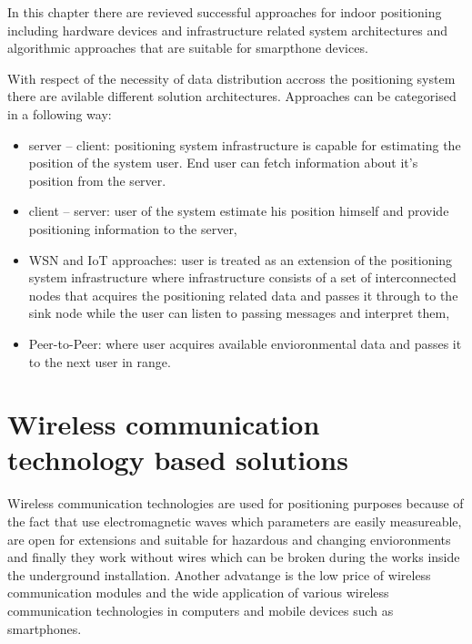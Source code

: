 \documentclass[../main.tex]{subfiles}
\begin{document}
In this chapter there are revieved successful approaches for indoor positioning including hardware devices and infrastructure related system architectures and algorithmic approaches that are suitable for smarpthone devices.


With respect of the necessity of data distribution accross the positioning system there are avilable different solution architectures. Approaches can be categorised in a following way:
\begin{itemize}
	\item server -- client: positioning system infrastructure is capable for estimating the position of the system user. End user can fetch information about it's position from the server.
	\item client -- server: user of the system estimate his position himself and provide positioning information to the server,
	\item WSN and IoT approaches: user is treated as an extension of the positioning system infrastructure where infrastructure consists of a set of interconnected nodes that acquires the positioning related data and passes it through to the sink node while the user can listen to passing messages and interpret them,
	\item Peer-to-Peer: where user acquires available envioronmental data and passes it to the next user in range.
\end{itemize}


\section{Wireless communication technology based solutions}
\label{sec:wireless_comm_tech_solutions}

Wireless communication technologies are used for positioning purposes because of the fact that use electromagnetic waves which parameters are easily measureable, are open for extensions and suitable for hazardous and changing envioronments and finally they work without wires which can be broken during the works inside the underground installation. Another advatange is the low price of wireless communication modules and the wide application of various wireless communication technologies in computers and mobile devices such as smartphones.
\end{document}
